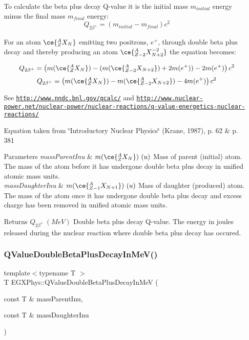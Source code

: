 To calculate the beta plus decay Q-\/value it is the initial mass $m_{initial}$ energy minus the final mass $m_{final}$ energy\+: \[Q_{2\beta^+} = \left ( m_{initial}-m_{final}\right ) c^2\]

For an atom $\ce{ ^{A}_{Z}X_{N} }$ emitting two positrons, $e^+$, through double beta plus decay and thereby producing an atom $\ce{ ^{A}_{Z{-2}}X^{-2}_{N{+2}} }$ the equation becomes\+:

\[Q_{2\beta^+} = \left ( m(\ce{ ^{A}_{Z}X_{N} }) - (m(\ce{ ^{A}_{Z{-2}}X_{N{+2}} }) + 2m(e^+)) - 2m(e^+)\right ) c^2\] \[Q_{2\beta^+} = \left ( m(\ce{ ^{A}_{Z}X_{N} }) - m(\ce{ ^{A}_{Z{-2}}X_{N{+2}} }) - 4m(e^+)\right ) c^2\]

See \href{http://www.nndc.bnl.gov/qcalc/}{\tt http\+://www.\+nndc.\+bnl.\+gov/qcalc/} and \href{http://www.nuclear-power.net/nuclear-power/nuclear-reactions/q-value-energetics-nuclear-reactions/}{\tt http\+://www.\+nuclear-\/power.\+net/nuclear-\/power/nuclear-\/reactions/q-\/value-\/energetics-\/nuclear-\/reactions/}

Equation taken from \char`\"{}\+Introductory Nuclear Physics\char`\"{} (Krane, 1987), p. 62 \& p. 381


\begin{DoxyParams}{Parameters}
{\em mass\+Parent\+Inu} & $m(\ce{ ^{A}_{Z}X_{N} })\ (u)$ Mass of parent (initial) atom. The mass of the atom before it has undergone double beta plus decay in unified atomic mass units. \\
\hline
{\em mass\+Daughter\+Inu} & $m(\ce{ ^{A}_{Z{-1}}X_{N{+1}} })\ (u)$ Mass of daughter (produced) atom. The mass of the atom once it has undergone double beta plus decay and excess charge has been removed in unified atomic mass units. \\
\hline
\end{DoxyParams}
\begin{DoxyReturn}{Returns}
$Q_{2\beta^+}\ (MeV)$ Double beta plus decay Q-\/value. The energy in joules released during the nuclear reaction where double beta plus decay has occured. 
\end{DoxyReturn}
\mbox{\label{group___e_g_x_phys-_q_value_ga3fb4b374bc1df69b96a66d0488bb2ba1}} 
\subsubsection{\texorpdfstring{Q\+Value\+Double\+Beta\+Plus\+Decay\+In\+Me\+V()}{QValueDoubleBetaPlusDecayInMeV()}}
{\footnotesize\ttfamily template$<$typename T $>$ \\
T E\+G\+X\+Phys\+::\+Q\+Value\+Double\+Beta\+Plus\+Decay\+In\+MeV (\begin{DoxyParamCaption}\item[{const T \&}]{mass\+Parent\+Inu,  }\item[{const T \&}]{mass\+Daughter\+Inu }\end{DoxyParamCaption})}



